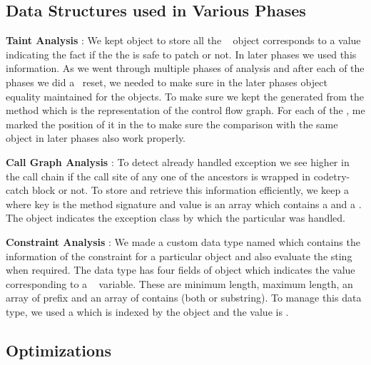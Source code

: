 \subsection{Data Structures used in Various Phases}
\label{subsec:dataStructure}

\begin{mylist}
\item \textbf{Taint Analysis} : We kept  object to store all the
\soot\  object corresponds to a  value indicating
the fact if the the  is safe to patch or not. In later phases we
used this information. As we went through multiple phases of analysis and
after each of the phases we did a \soot\ reset, we needed to make sure in the
later phases object equality maintained for the  objects. To make 
sure we kept the  generated from the  method
 which is the representation of the control flow graph. For each of 
the , me marked the position of it in the  to 
make sure the comparison with the same  object in later phases also
work properly. 

\item \textbf{Call Graph Analysis} : To detect already handled exception we
see higher in the call chain if the call site of any one of the ancestors is
wrapped in code{try-catch} block or not. To store and retrieve this information
efficiently, we keep a  where key is the method signature and 
value is an  array which contains a  and a .
The  object indicates the exception class by which the particular
 was handled.

\item \textbf{Constraint Analysis} : We made a custom data type named  
which contains the information of the constraint for a particular  object and also evaluate
the sting when required. The data type has four fields of  object which
indicates the value corresponding to a \soot\  variable. These are minimum
length, maximum length, an array of prefix and an array of contains (both 
or substring). To manage this data type, we used a  which is indexed by the
 object and the value is .

\end{mylist}


\subsection{Optimizations}
\label{subsec:optimizations}

